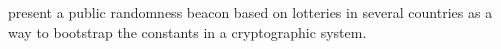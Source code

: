 \item[Trap me if you can --- Million dollar Curve]
\citet{baigneres2015trap} present a public randomness beacon based on lotteries in several countries as a way to bootstrap the constants in a cryptographic system. 
